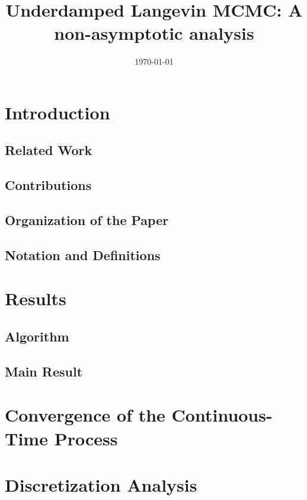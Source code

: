 \documentclass[final,12pt]{colt2018} %
\title{Underdamped Langevin MCMC: A non-asymptotic analysis} %
\date{\today}
\begin{document}
\maketitle

\begin{abstract}

\end{abstract}
\section{Introduction}

%
\subsection{Related Work}

\subsection{Contributions}

\subsection{Organization of the Paper}

%
\subsection{Notation and Definitions}

\section{Results}
\label{s:resultsmain}
\subsection{Algorithm}

\subsection{Main Result}

\section{Convergence of the Continuous-Time Process}

\section{Discretization Analysis}

\end{document}
